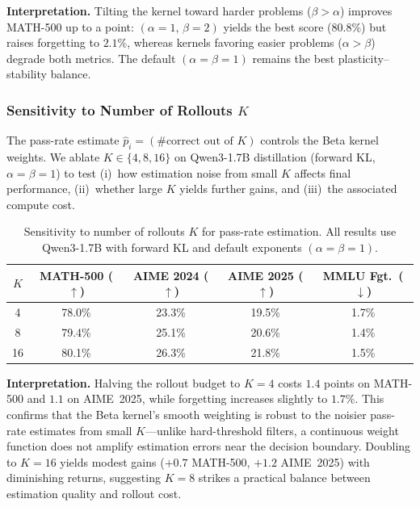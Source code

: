 \documentclass{article}
\newcommand{\mstd}[2]{#1\if\relax\detokenize{#2}\relax\else{$\scriptstyle\,\pm\,#2$}\fi\%}
\begin{document}
\textbf{Interpretation.} Tilting the kernel toward harder problems ($\beta > \alpha$) improves MATH-500 up to a point: $(\alpha{=}1,\,\beta{=}2)$ yields the best score ($80.8\%$) but raises forgetting to $2.1\%$, whereas kernels favoring easier problems ($\alpha > \beta$) degrade both metrics. The default $(\alpha{=}\beta{=}1)$ remains the best plasticity--stability balance.

\subsubsection{Sensitivity to Number of Rollouts $K$}
\label{app:ablation_K}
The pass-rate estimate $\hat{p}_i = (\text{\# correct out of }K)$ controls the Beta kernel weights.
We ablate $K \in \{4, 8, 16\}$ on Qwen3-1.7B distillation (forward KL, $\alpha{=}\beta{=}1$) to test (i)~how estimation noise from small $K$ affects final performance, (ii)~whether large $K$ yields further gains, and (iii)~the associated compute cost.

\begin{table}[h]
\caption{Sensitivity to number of rollouts $K$ for pass-rate estimation. All results use Qwen3-1.7B with forward KL and default exponents $(\alpha{=}\beta{=}1)$.}
\centering
\begin{tabular}{c|cccc}
\toprule
$K$ & MATH-500 ($\uparrow$) & AIME 2024 ($\uparrow$) & AIME 2025 ($\uparrow$) & MMLU Fgt.\ ($\downarrow$) \\
\midrule
4  & \mstd{78.0}{} & \mstd{23.3}{} & \mstd{19.5}{} & 1.7\% \\
8  & \mstd{79.4}{} & \mstd{25.1}{} & \mstd{20.6}{} & 1.4\% \\
16 & \mstd{80.1}{} & \mstd{26.3}{} & \mstd{21.8}{} & 1.5\% \\
\bottomrule
\end{tabular}
\label{tab:ablation_K}
\end{table}

\textbf{Interpretation.} Halving the rollout budget to $K{=}4$ costs $1.4$ points on MATH-500 and $1.1$ on AIME~2025, while forgetting increases slightly to $1.7\%$. This confirms that the Beta kernel's smooth weighting is robust to the noisier pass-rate estimates from small $K$---unlike hard-threshold filters, a continuous weight function does not amplify estimation errors near the decision boundary. Doubling to $K{=}16$ yields modest gains ($+0.7$ MATH-500, $+1.2$ AIME~2025) with diminishing returns, suggesting $K{=}8$ strikes a practical balance between estimation quality and rollout cost.
\end{document}
